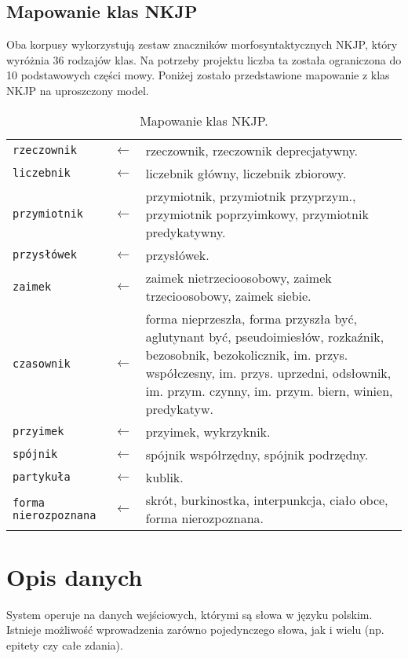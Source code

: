 	\subsection{Mapowanie klas NKJP}
Oba korpusy wykorzystują zestaw znaczników morfosyntaktycznych NKJP, który wyróżnia 36 rodzajów klas.
Na potrzeby projektu liczba ta została ograniczona do 10 podstawowych części mowy. Poniżej zostało przedstawione mapowanie z klas NKJP na uproszczony model.
\begin{table}[H]
	\centering
	\caption{Mapowanie klas NKJP.}
	\begin{tabular}{p{3cm}p{.5cm}p{11cm}}
		\toprule
		\texttt{rzeczownik} & $\leftarrow$ & rzeczownik, rzeczownik deprecjatywny. \\
		\texttt{liczebnik} & $\leftarrow$ & liczebnik główny, liczebnik zbiorowy. \\
		\texttt{przymiotnik} & $\leftarrow$ & przymiotnik, przymiotnik przyprzym., przymiotnik poprzyimkowy, przymiotnik predykatywny. \\
		\texttt{przysłówek} & $\leftarrow$ & przysłówek. \\
		\texttt{zaimek} & $\leftarrow$ & zaimek nietrzecioosobowy, zaimek trzecioosobowy, zaimek siebie. \\
		\texttt{czasownik} & $\leftarrow$ & forma nieprzeszła, forma przyszła być, aglutynant być, pseudoimiesłów, rozkaźnik, bezosobnik, bezokolicznik, im. przys. współczesny, im. przys. uprzedni, odsłownik, im. przym. czynny, im. przym. biern, winien, predykatyw. \\
		\texttt{przyimek} & $\leftarrow$ & przyimek, wykrzyknik. \\
		\texttt{spójnik} & $\leftarrow$ & spójnik współrzędny, spójnik podrzędny. \\
		\texttt{partykuła} & $\leftarrow$ & kublik. \\
		\texttt{forma nierozpoznana} & $\leftarrow$ & skrót, burkinostka, interpunkcja, ciało obce, forma nierozpoznana. \\
		\bottomrule
	\end{tabular}
\end{table}

\section{Opis danych}
	System operuje na danych wejściowych, którymi są słowa w języku polskim.
	Istnieje możliwość wprowadzenia zarówno pojedynczego słowa, jak i wielu (np. epitety czy całe zdania).
	
